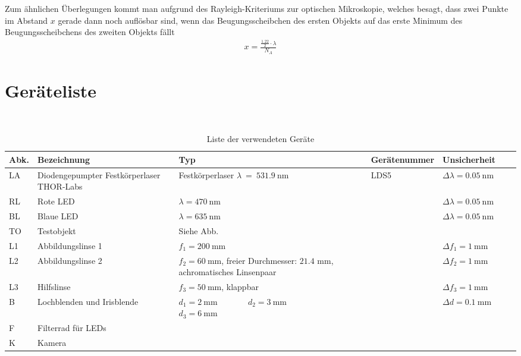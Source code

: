 \documentclass{article}
\begin{document}
Zum ähnlichen Überlegungen kommt man aufgrund des Rayleigh-Kriteriums zur optischen Mikroskopie, welches besagt, dass zwei Punkte im Abstand $x$ gerade dann noch auflösbar sind, wenn das Beugungsscheibchen des ersten Objekts auf das erste Minimum des Beugungsscheibchens des zweiten Objekts fällt \cite{quelle4} \cite{quelle5}
\begin{align}
x = \frac{\frac{1.22}{2}\cdot \lambda}{N_A}
\end{align}






\section{Geräteliste}

\begin{table}[H]
\caption{Liste der verwendeten Geräte}

~

\begin{tabular}{l|p{3cm}p{3cm}llll}
Abk. & Bezeichnung  & Typ & Gerätenummer & Unsicherheit \\
\hline
LA & Diodenge\-pumpter Festkörperlaser THOR-Labs  & Festkörperlaser $\lambda~=~531.9~$nm & LDS5 & $\Delta \lambda = 0.05~$nm \\
\hline
RL & Rote LED &  $\lambda=470~$nm & & $\Delta \lambda = 0.05~$nm \\
\hline
BL & Blaue LED &  $\lambda=635~$nm & & $\Delta \lambda = 0.05~$nm \\
\hline
TO & Testobjekt & Siehe Abb. \\
\hline
L1 & Abbildungslinse 1 & $f_1 = 200~$mm & & $\Delta f_1 = 1~$mm \\
\hline
L2 & Abbildungslinse 2 & $f_2= 60~$mm, freier Durchmesser: $21.4$ mm, achromatisches Linsenpaar & & $\Delta f_2 = 1~$mm\\
\hline
L3 & Hilfslinse & $f_3 = 50~$mm, klappbar & & $\Delta f_3 = 1~$mm \\
\hline
B & Lochblenden und Irisblende & $d_1=2~$mm ~ ~ ~ ~ $d_2=3~$mm   ~~~~~~~~~~~~ $d_3=6~$mm & &  $\Delta d = 0.1~$mm \\
\hline
F & Filterrad für LEDs & \\
\hline
K & Kamera
\end{tabular}

\end{table}
\end{document}
